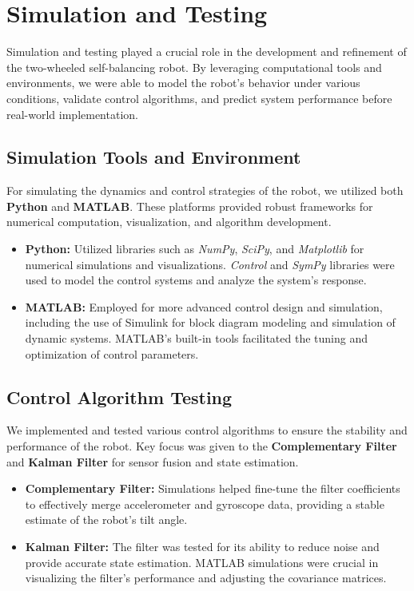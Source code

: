 \section{Simulation and Testing}
Simulation and testing played a crucial role in the development and refinement of the two-wheeled self-balancing robot. By leveraging computational tools and environments, we were able to model the robot's behavior under various conditions, validate control algorithms, and predict system performance before real-world implementation.

\subsection{Simulation Tools and Environment}
For simulating the dynamics and control strategies of the robot, we utilized both \textbf{Python} and \textbf{MATLAB}. These platforms provided robust frameworks for numerical computation, visualization, and algorithm development.

\begin{itemize}
\item \textbf{Python:} Utilized libraries such as \textit{NumPy}, \textit{SciPy}, and \textit{Matplotlib} for numerical simulations and visualizations. \textit{Control} and \textit{SymPy} libraries were used to model the control systems and analyze the system's response.
\item \textbf{MATLAB:} Employed for more advanced control design and simulation, including the use of Simulink for block diagram modeling and simulation of dynamic systems. MATLAB's built-in tools facilitated the tuning and optimization of control parameters.
\end{itemize}

\subsection{Control Algorithm Testing}
We implemented and tested various control algorithms to ensure the stability and performance of the robot. Key focus was given to the \textbf{Complementary Filter} and \textbf{Kalman Filter} for sensor fusion and state estimation.

\begin{itemize}
\item \textbf{Complementary Filter:} Simulations helped fine-tune the filter coefficients to effectively merge accelerometer and gyroscope data, providing a stable estimate of the robot's tilt angle.
\item \textbf{Kalman Filter:} The filter was tested for its ability to reduce noise and provide accurate state estimation. MATLAB simulations were crucial in visualizing the filter's performance and adjusting the covariance matrices.
\end{itemize}

